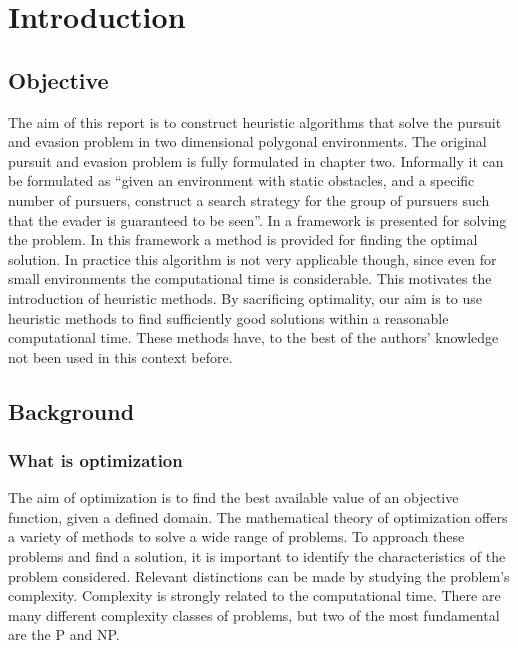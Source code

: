 \chapter{Introduction}

\section{Objective}
The aim of this report is to construct heuristic algorithms that solve the pursuit and evasion problem in two dimensional polygonal environments. The original pursuit and evasion problem is fully formulated in chapter two. Informally it can be formulated as ``given an environment with static obstacles, and a specific number of pursuers, construct a search strategy for the group of pursuers such that the evader is guaranteed to be seen''. In \cite{paper3} a framework is presented for solving the problem. In this framework a method is provided for finding the optimal solution. In practice this algorithm is not very applicable though, since even for small environments the computational time is considerable. This motivates the introduction of heuristic methods. By sacrificing optimality, our aim is to use heuristic methods to find sufficiently good solutions within a reasonable computational time. These methods have, to the best of the authors' knowledge not been used in this context before.
\section{Background}
\subsection{What is optimization}
The aim of optimization is to find the best available value of an objective function, given a defined domain. %
The mathematical theory of optimization offers a variety of methods to solve a wide range of problems. To approach these problems and find a solution, it is important to identify the characteristics of the problem considered. Relevant distinctions can be made by studying the problem's complexity. Complexity is strongly related to the computational time. There are many different complexity classes of problems, but two of the most fundamental are the P and NP.

